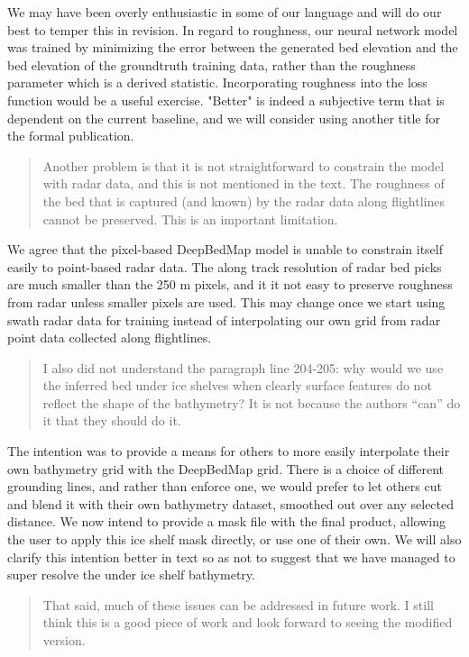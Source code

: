 We may have been overly enthusiastic in some of our language and will do our best to temper this in revision.
In regard to roughness, our neural network model was trained by minimizing the error between the generated bed elevation and the bed elevation of the groundtruth training data, rather than the roughness parameter which is a derived statistic.
Incorporating roughness into the loss function would be a useful exercise.
"Better" is indeed a subjective term that is dependent on the current baseline, and we will consider using another title for the formal publication.

\begin{quote}
\color{blue}
Another problem is that it is not straightforward to constrain the model with radar data, and this is not mentioned in the text.
The roughness of the bed that is captured (and known) by the radar data along flightlines cannot be preserved.
This is an important limitation.
\end{quote}

We agree that the pixel-based DeepBedMap model is unable to constrain itself easily to point-based radar data.
The along track resolution of radar bed picks are much smaller than the 250 m pixels, and it it not easy to preserve roughness from radar unless smaller pixels are used.
This may change once we start using swath radar data for training instead of interpolating our own grid from radar point data collected along flightlines.

\begin{quote}
\color{blue}
  I also did not understand the paragraph line 204-205: why would we use the inferred bed under ice shelves when clearly surface features do not reflect the shape of the bathymetry?
  It is not because the authors “can” do it that they should do it.
\end{quote}

The intention was to provide a means for others to more easily interpolate their own bathymetry grid with the DeepBedMap grid.
There is a choice of different grounding lines, and rather than enforce one, we would prefer to let others cut and blend it with their own bathymetry dataset, smoothed out over any selected distance.
We now intend to provide a mask file with the final product, allowing the user to apply this ice shelf mask directly, or use one of their own.
We will also clarify this intention better in text so as not to suggest that we have managed to super resolve the under ice shelf bathymetry.

\begin{quote}
\color{blue}
That said, much of these issues can be addressed in future work. I still think this is a good piece of work and look forward to seeing the modified version.
\end{quote}

